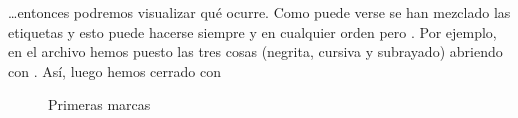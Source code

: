 \documentclass[a4paper,12pt,spanish]{sphinxmanual}
\begin{document}
…entonces podremos visualizar qué ocurre. Como puede verse se han mezclado las etiquetas y esto puede hacerse siempre y en cualquier orden pero . Por ejemplo, en el archivo hemos puesto las tres cosas (negrita, cursiva y subrayado) abriendo con . Así, luego hemos cerrado con 

\begin{figure}[htbp]
\centering
\capstart

\noindent{}
\caption{Primeras marcas}\label{\detokenize{index:id12}}\end{figure}



\renewcommand{\indexname}{Índice}
\printindex
\end{document}
